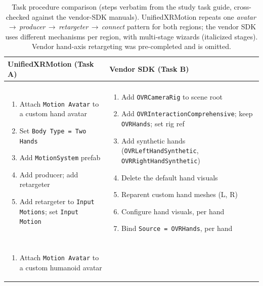 \documentclass[runningheads]{llncs}
\newenvironment{cellsteps}
  {\begin{enumerate}[leftmargin=*,labelsep=0.4em,labelindent=0pt,
       topsep=0pt,partopsep=0pt,itemsep=0pt,parsep=0pt,label=\arabic*.]}
  {\end{enumerate}}
\begin{document}
\begin{table}[t]
	\caption{Task procedure comparison (steps verbatim from the study task guide, cross-checked against the vendor-SDK manuals). UnifiedXRMotion repeats one \emph{avatar\,$\to$\,producer\,$\to$\,retargeter\,$\to$\,connect} pattern for both regions; the vendor SDK uses different mechanisms per region, with multi-stage wizards (italicized stages). Vendor hand-axis retargeting was pre-completed and is omitted.}
	\label{tab:task-procedure}
	\centering
	\scriptsize
	\setlength{\tabcolsep}{4pt}
	\renewcommand{\arraystretch}{1.0}
	\begin{tabularx}{\textwidth}{@{}>{\raggedright\arraybackslash}X >{\raggedright\arraybackslash}X@{}}
		\toprule
		UnifiedXRMotion (Task A) & Vendor SDK (Task B) \\
		\midrule
		\multicolumn{2}{@{}l}{\textbf{Hands}} \\[-4pt]
		\begin{cellsteps}
		     \item Attach \texttt{Motion\,Avatar} to a custom hand avatar
		     \item Set \texttt{Body\,Type\,=\,Two\,Hands}
		     \item Add \texttt{MotionSystem} prefab
		     \item Add producer; add retargeter
		     \item Add retargeter to \texttt{Input\,Motions}; set \texttt{Input\,Motion}
		   \end{cellsteps}
		 & \begin{cellsteps}
		     \item Add \texttt{OVRCameraRig} to scene root
		     \item Add \texttt{OVRInteractionComprehensive}; keep \texttt{OVRHands}; set rig ref
		     \item Add synthetic hands (\texttt{OVRLeftHandSynthetic}, \texttt{OVRRightHandSynthetic})
		     \item Delete the default hand visuals
		     \item Reparent custom hand meshes (L, R)
		     \item Configure hand visuals, per hand
		     \item Bind \texttt{Source\,=\,OVRHands}, per hand
		   \end{cellsteps} \\
		\midrule
		\multicolumn{2}{@{}l}{\textbf{Body}} \\[-4pt]
		\begin{cellsteps}
		     \item Attach \texttt{Motion\,Avatar} to a custom humanoid avatar

\end{cellsteps}
\end{tabularx}
\end{table}
\end{document}
